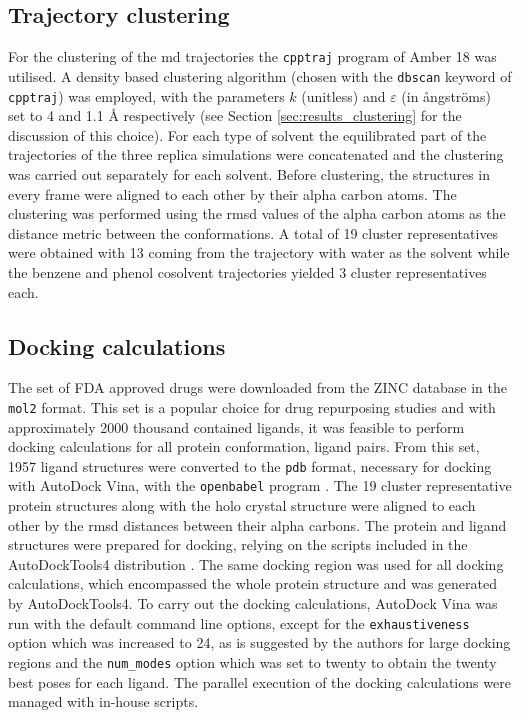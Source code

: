 \subsection{Trajectory clustering}\label{sec:comp_details:clustering}
For the clustering of the \gls{md} trajectories the \texttt{cpptraj} program \cite{cpptraj} of Amber 18 was utilised.
A density based clustering algorithm (chosen with the \texttt{dbscan} keyword of \texttt{cpptraj}) was employed, with the parameters $k$ (unitless) and $\varepsilon$ (in \aa{}ngstr\"oms) set to 4 and 1.1 \AA{} respectively (see Section \ref{sec:results_clustering} for the discussion of this choice).
For each type of solvent the equilibrated part of the trajectories of the three replica simulations were concatenated and the clustering was carried out separately for each solvent.
Before clustering, the structures in every frame were aligned to each other by their alpha carbon atoms.
The clustering was performed using the \gls{rmsd} values of the alpha carbon atoms as the distance metric between the conformations.
A total of 19 cluster representatives were obtained with 13 coming from the trajectory with water as the solvent while the benzene and phenol cosolvent trajectories yielded 3 cluster representatives each.

\subsection{Docking calculations}\label{sec:results:comp_details:docking}
The set of FDA approved drugs were downloaded from the ZINC database \cite{zinc} in the \texttt{mol2} format.
This set is a popular choice for drug repurposing studies \cite{ml_inhibitors,rdrp_virtual_screening2,rdrp_virtual_screening3} and with approximately 2000 thousand contained ligands, it was feasible to perform docking calculations for all protein conformation, ligand pairs.
From this set, 1957 ligand structures were converted to the \texttt{pdb} format, necessary for docking with AutoDock Vina, with the \texttt{openbabel} program \cite{openbabel}.
The 19 cluster representative protein structures along with the holo crystal structure were aligned to each other by the \gls{rmsd} distances between their alpha carbons.
The protein and ligand structures were prepared for docking, relying on the scripts included in the AutoDockTools4 distribution \cite{autodocktools}.
The same docking region was used for all docking calculations, which encompassed the whole protein structure and was generated by AutoDockTools4.
To carry out the docking calculations, AutoDock Vina was run with the default command line options, except for the \texttt{exhaustiveness} option which was increased to 24, as is suggested by the authors for large docking regions and the \texttt{num\_modes} option which was set to twenty to obtain the twenty best poses for each ligand.
The parallel execution of the docking calculations were managed with in-house scripts.

